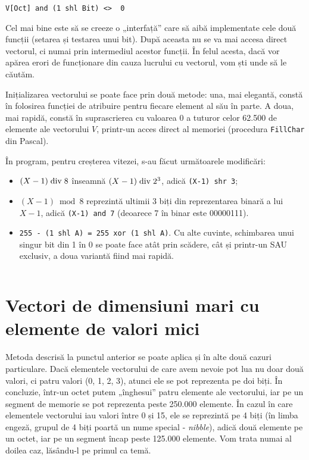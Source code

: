 \begin{verbatim}
V[Oct] and (1 shl Bit) <>  0
\end{verbatim}

Cel mai bine este să se creeze o „interfață” care să aibă implementate cele
două funcții (setarea și testarea unui bit). După aceasta nu se va mai accesa
direct vectorul, ci numai prin intermediul acestor funcții. În felul acesta,
dacă vor apărea erori de funcționare din cauza lucrului cu vectorul, vom ști
unde să le căutăm.

Inițializarea vectorului se poate face prin două metode: una, mai elegantă,
constă în folosirea funcției de atribuire pentru fiecare element al său în
parte. A doua, mai rapidă, constă în suprascrierea cu valoarea 0 a tuturor
celor 62.500 de elemente ale vectorului $V$, printr-un acces direct al
memoriei (procedura {\tt FillChar} din Pascal).

În program, pentru creșterea vitezei, s-au făcut următoarele modificări:

\begin{itemize}

\item $(X-1) \bdiv 8$ înseamnă $(X-1) \bdiv 2^3$, adică {\tt (X-1) shr 3};

\item $(X-1) \bmod 8$ reprezintă ultimii 3 biți din reprezentarea binară a
  lui $X - 1$, adică {\tt (X-1) and 7} (deoarece 7 în binar este 00000111).

\item {\tt 255 - (1 shl A) = 255 xor (1 shl A)}. Cu alte cuvinte, schimbarea
  unui singur bit din 1 în 0 se poate face atât prin scădere, cât și printr-un
  SAU exclusiv, a doua variantă fiind mai rapidă.

\end{itemize}

\inputminted{pascal}{src/chapter3-1.pas}

\section{Vectori de dimensiuni mari cu elemente de valori mici}

Metoda descrisă la punctul anterior se poate aplica și în alte două cazuri
particulare. Dacă elementele vectorului de care avem nevoie pot lua nu doar
două valori, ci patru valori (0, 1, 2, 3), atunci ele se pot reprezenta pe doi
biți. În concluzie, într-un octet putem „înghesui” patru elemente ale
vectorului, iar pe un segment de memorie se pot reprezenta peste 250.000
elemente. În cazul în care elementele vectorului iau valori între 0 și 15, ele
se reprezintă pe 4 biți (în limba engeză, grupul de 4 biți poartă un nume
special - {\it nibble}), adică două elemente pe un octet, iar pe un segment
încap peste 125.000 elemente. Vom trata numai al doilea caz, lăsându-l pe
primul ca temă.

